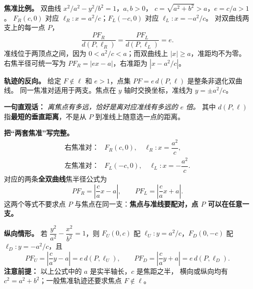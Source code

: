 \begin{statementbox}
\textbf{焦准比例。} 双曲线 $x^2/a^2-y^2/b^2=1$，$a,b>0$，
$c=\sqrt{a^2+b^2}>a$，$e=c/a>1$。
$F_R(c,0)$ 对应 $\ell_R:x=a^2/c$；$F_L(-c,0)$ 对应 $\ell_L:x=-a^2/c$。
对双曲线两支上的每一点 $P$，
\[
\boxed{\frac{PF_R}{d(P,\ell_R)}=\frac{PF_L}{d(P,\ell_L)}=e}.
\]
准线位于两顶点之间，因为 $0<a^2/c<a$；而双曲线上 $|x|\ge a$，准距均不为零。
右焦半径可统一写为 $\boxed{PF_R=|ex-a|}$，右准距为 $|x-a^2/c|$。

\textbf{轨迹的反向。} 给定 $F\notin\ell$ 和 $e>1$，点集 $PF=e\,d(P,\ell)$ 是整条非退化双曲线。
同一焦准对适用于两支。焦点在 $y$ 轴时交换坐标，准线为 $y=\pm a^2/c$。
\end{statementbox}
\clearpage
\begin{statementbox}

\medskip
\textbf{一句直观话：} \emph{离焦点有多远，恰好是离对应准线有多远的 $e$ 倍。}
其中 $d(P,\ell)$ 指\textbf{最短的垂直距离}，不是从 $P$ 到准线上随意选一点的距离。

\textbf{把“两套焦准”写完整。}
\[
\begin{array}{ll}
\text{右焦准对：}&F_R(c,0),\quad \ell_R:x=\dfrac{a^2}{c},\\[3pt]
\text{左焦准对：}&F_L(-c,0),\quad \ell_L:x=-\dfrac{a^2}{c}.
\end{array}
\]
对应的两条\textbf{全双曲线}焦半径公式为
\[
\boxed{PF_R=\left|\frac ca x-a\right|},\qquad
\boxed{PF_L=\left|\frac ca x+a\right|}.
\]
这两个等式不要求点 $P$ 与焦点在同一支：\textbf{焦点与准线要配对，点 $P$ 可以在任意一支。}

\textbf{纵向情形。} 若 $\dfrac{y^2}{a^2}-\dfrac{x^2}{b^2}=1$，则
$F_U(0,c)$ 配 $\ell_U:y=a^2/c$，$F_D(0,-c)$ 配 $\ell_D:y=-a^2/c$，且
\[
\boxed{PF_U=\left|\frac ca y-a\right|
=e\,d(P,\ell_U)},\qquad
\boxed{PF_D=\left|\frac ca y+a\right|
=e\,d(P,\ell_D)}.
\]
\textbf{注意前提：} 以上公式中的 $a$ 是实半轴长，$c$ 是焦距之半，
横向或纵向均有 $c^2=a^2+b^2$；一般焦准轨迹还要求焦点 $F\notin\ell$。

\end{statementbox}
